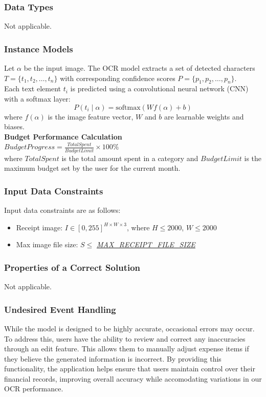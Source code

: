 \documentclass[12pt]{article}
\begin{document}
\subsubsection{Data Types}\label{sec_datatypes} Not applicable.

\subsubsection{Instance Models} \label{sec_instance}    
Let $\alpha$ be the input image. The OCR model extracts a set of detected characters $T = \{t_1, t_2, \dots, t_n\}$ with corresponding confidence scores $P = \{p_1, p_2, \dots, p_n\}$.\\
Each text element $t_i$ is predicted using a convolutional neural network (CNN) with a softmax layer:
\[
P(t_i \mid \alpha) = \text{softmax}(W f(\alpha) + b)
\]
where $f(\alpha)$ is the image feature vector, $W$ and $b$ are learnable weights and biases.\\
\textbf{Budget Performance Calculation}\\
$BudgetProgress = \frac{TotalSpent}{BudgetLimit} \times 100\%$\\
where $TotalSpent$ is the total amount spent in a category and $BudgetLimit$ is the maximum budget set by the user for the current month.

\subsubsection{Input Data Constraints} \label{sec_DataConstraints}    

Input data constraints are as follows:
\begin{itemize}
  \item Receipt image: $I \in [0, 255]^{H \times W \times 3}$, where $H \leq 2000$, $W \leq 2000$
  \item Max image file size: $S \leq$ \hyperref[Table:AuxConstants]{\textit{MAX\_RECEIPT\_FILE\_SIZE}}
\end{itemize}

\subsubsection{Properties of a Correct Solution} \label{sec_CorrectSolution} Not
applicable.

\subsubsection{Undesired Event Handling} \label{sec_UndesiredEventHandling} While the model is designed to be highly accurate, occasional
errors may occur. To address this, users have the ability to review and correct any inaccuracies through an edit feature. This allows them to manually adjust
expense items if they believe the generated information is incorrect. By providing this functionality, the application helps ensure
that users maintain control over their financial records, improving overall accuracy while accomodating variations in our OCR performance. 
\end{document}
